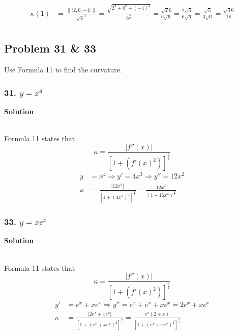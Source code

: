 \documentclass{article}
\begin{document}
\begin{align*}
    \kappa(1) &= \frac{\| \langle 2, 0, -4 \rangle \|}{\sqrt 6^3} = \frac{\sqrt{2^2 + 0^2 + (-4)^2}}{6^{\frac 3 2}} = \frac{\sqrt 20}{6\sqrt 6} = \frac{2\sqrt 5}{6\sqrt 6} = \frac{\sqrt 5}{3\sqrt 6} = \frac{\sqrt 30}{18} \\
\end{align*}


\subsection*{Problem 31 \& 33}

Use Formula 11 to find the curvature.

\subsubsection*{31. $y = x^4$}
\centerline{\textbf{Solution}} \\
Formula 11 states that 
\[
    \kappa = \frac{|f''(x)|}{[1 + (f'(x)^2)]^{\frac 3 2}}
\]
\begin{align*}
    y &= x^4 \Rightarrow y' = 4x^3 \Rightarrow y'' = 12x^2 \\
    \kappa &= \frac{|12x^2|}{[1+(4x^3)^2]^{\frac 3 2}} = \frac{12x^2}{(1+16x^6)^{\frac{3}{2}}}
\end{align*}
\subsubsection*{33. $y = xe^x$}
\centerline{\textbf{Solution}} \\
Formula 11 states that 
\[
    \kappa = \frac{|f''(x)|}{[1 + (f'(x)^2)]^{\frac 3 2}}
\]
\begin{align*}
    y' &= e^x + xe^x \Rightarrow y'' = e^x + e^x + xe^x = 2e^x + xe^x \\
    \kappa &= \frac {|2e^x + xe^x|} {[1+ (e^x + xe^x)^2]^{\frac 3 2}} = \frac {e^x(2 + x)} {[1+ (e^x + xe^x)^2]^{\frac 3 2}}
\end{align*}
\end{document}
